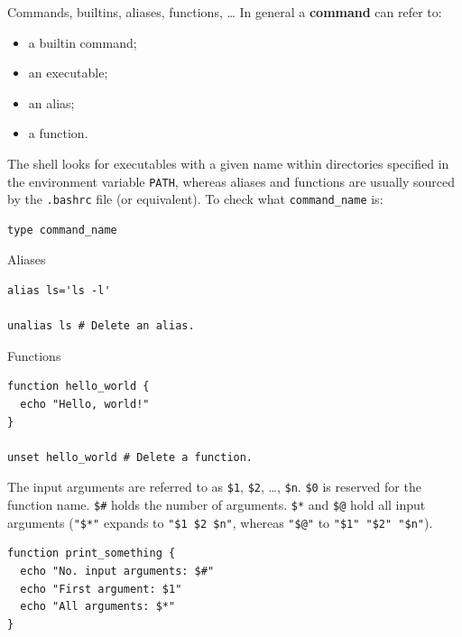 \documentclass{beamer}
\begin{document}
\begin{frame}[fragile]{Commands, builtins, aliases, functions, \dots}
In general a \textbf{command} can refer to:
\begin{itemize}
    \item a builtin command;
    \item an executable;
    \item an alias;
    \item a function.
\end{itemize}
\vfill
The shell looks for executables with a given name within directories specified in the environment variable \texttt{PATH}, whereas aliases and functions are usually sourced by the \texttt{.bashrc} file (or equivalent).
\vfill
To check what \texttt{command\_name} is:
\begin{lstlisting}
type command_name
\end{lstlisting}
\end{frame}

\begin{frame}[fragile]{Aliases}
\begin{lstlisting}
alias ls='ls -l'

unalias ls # Delete an alias.
\end{lstlisting}
\end{frame}

\begin{frame}[fragile]{Functions}
\begin{lstlisting}
function hello_world {
  echo "Hello, world!"
}

unset hello_world # Delete a function.
\end{lstlisting}
\vfill
The input arguments are referred to as \texttt{\$1}, \texttt{\$2}, \dots, \texttt{\$n}. \texttt{\$0} is reserved for the function name. \texttt{\$\#} holds the number of arguments. \texttt{\$*} and \texttt{\$@} hold all input arguments (\texttt{"\$*"} expands to \texttt{"\$1 \$2 \$n"}, whereas \texttt{"\$@"} to \texttt{"\$1" "\$2" "\$n"}).
\begin{lstlisting}
function print_something {
  echo "No. input arguments: $#"
  echo "First argument: $1"
  echo "All arguments: $*"
}
\end{lstlisting}
\end{frame}
\end{document}

